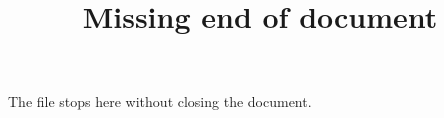 \documentclass{handout}
\title{Missing end of document}
\begin{document}
\maketitle
The file stops here without closing the document.
\end{document}
